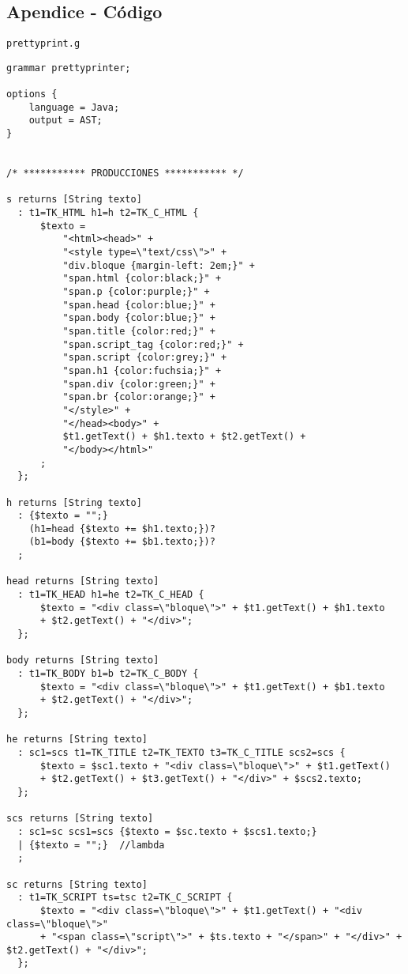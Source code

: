 \subsection{Apendice - Código}
\texttt{prettyprint.g}
{\tiny
\begin{verbatim}
grammar prettyprinter;

options {
    language = Java;
    output = AST;
}


/* *********** PRODUCCIONES *********** */

s returns [String texto]
  : t1=TK_HTML h1=h t2=TK_C_HTML {
      $texto = 
          "<html><head>" + 
          "<style type=\"text/css\">" + 
          "div.bloque {margin-left: 2em;}" + 
          "span.html {color:black;}" +
          "span.p {color:purple;}" +
          "span.head {color:blue;}" +
          "span.body {color:blue;}" +
          "span.title {color:red;}" +
          "span.script_tag {color:red;}" +
          "span.script {color:grey;}" +
          "span.h1 {color:fuchsia;}" +
          "span.div {color:green;}" +
          "span.br {color:orange;}" +
          "</style>" +
          "</head><body>" +
          $t1.getText() + $h1.texto + $t2.getText() + 
          "</body></html>"
      ;
  };
  
h returns [String texto]
  : {$texto = "";} 
    (h1=head {$texto += $h1.texto;})? 
    (b1=body {$texto += $b1.texto;})?
  ;

head returns [String texto]
  : t1=TK_HEAD h1=he t2=TK_C_HEAD {
      $texto = "<div class=\"bloque\">" + $t1.getText() + $h1.texto 
      + $t2.getText() + "</div>";
  };

body returns [String texto]
  : t1=TK_BODY b1=b t2=TK_C_BODY {
      $texto = "<div class=\"bloque\">" + $t1.getText() + $b1.texto 
      + $t2.getText() + "</div>";
  };
  
he returns [String texto]
  : sc1=scs t1=TK_TITLE t2=TK_TEXTO t3=TK_C_TITLE scs2=scs {
      $texto = $sc1.texto + "<div class=\"bloque\">" + $t1.getText() 
      + $t2.getText() + $t3.getText() + "</div>" + $scs2.texto;
  };

scs returns [String texto]
  : sc1=sc scs1=scs {$texto = $sc.texto + $scs1.texto;}
  | {$texto = "";}  //lambda
  ; 

sc returns [String texto]
  : t1=TK_SCRIPT ts=tsc t2=TK_C_SCRIPT {
      $texto = "<div class=\"bloque\">" + $t1.getText() + "<div class=\"bloque\">"
      + "<span class=\"script\">" + $ts.texto + "</span>" + "</div>" + $t2.getText() + "</div>";
  };  


\end{verbatim}}
